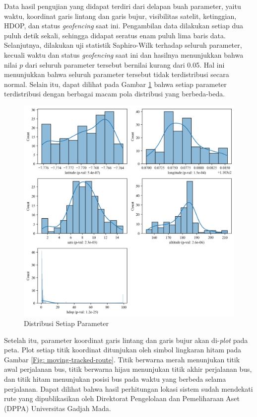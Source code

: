 Data hasil pengujian yang didapat terdiri dari delapan buah parameter, yaitu waktu, koordinat garis lintang dan garis bujur, visibilitas satelit, ketinggian, HDOP, dan status \textit{geofencing} saat ini. Pengambilan data dilakukan setiap dua puluh detik sekali, sehingga didapat seratus enam puluh lima baris data. Selanjutnya, dilakukan uji statistik Saphiro-Wilk terhadap seluruh parameter, kecuali waktu dan status \textit{geofencing} saat ini dan hasilnya menunjukkan bahwa nilai $p$ dari seluruh parameter tersebut bernilai kurang dari 0.05. Hal ini menunjukkan bahwa seluruh parameter tersebut tidak terdistribusi secara normal. Selain itu, dapat dilihat pada Gambar \ref{Fig: moving-distribusi} bahwa setiap parameter terdistribusi dengan berbagai macam pola distribusi yang berbeda-beda.

\begin{figure}[H]
	\centering
	\includegraphics[width=14cm]{contents/chapter-4/pengujian-bergerak/distribusi.png}
	\caption{Distribusi Setiap Parameter}
	\label{Fig: moving-distribusi}
\end{figure}

Setelah itu, parameter koordinat garis lintang dan garis bujur akan di-\textit{plot} pada peta. Plot setiap titik koordinat ditunjukan oleh simbol lingkaran hitam pada Gambar \ref{Fig: moving-tracked-route}. Titik berwarna merah menunjukan titik awal perjalanan bus, titik berwarna hijau menunjukan titik akhir perjalanan bus, dan titik hitam menunjukan posisi bus pada waktu yang berbeda selama perjalanan. Dapat dilihat bahwa hasil perhitungan lokasi sistem sudah mendekati rute yang dipublikasikan oleh Direktorat Pengelolaan dan Pemeliharaan Aset (DPPA) Universitas Gadjah Mada.

